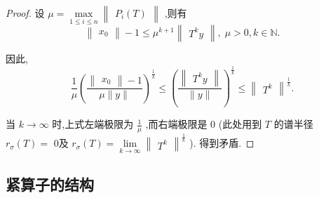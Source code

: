\documentclass[lang=cn,newtx,10pt,scheme=chinese,thmcnt=chapter]{elegantbook}
\begin{document}
\begin{proof}
设 \(\mu  = \mathop{\max }\limits_{{1 \leqslant  i \leqslant  n}}\begin{Vmatrix}{{P}_{i}\left( T\right) }\end{Vmatrix}\) ,则有
\begin{equation*}
\begin{Vmatrix}{x}_{0}\end{Vmatrix} - 1 \leqslant  {\mu }^{k + 1}\begin{Vmatrix}{{T}^{k}y}\end{Vmatrix},\;\mu  > 0,k \in  \mathbb{N}.
\end{equation*}

因此,
\begin{equation*}
\frac{1}{\mu }{\left( \frac{\begin{Vmatrix}{x}_{0}\end{Vmatrix} - 1}{\mu \parallel y\parallel }\right) }^{\frac{1}{k}} \leqslant  {\left( \frac{\begin{Vmatrix}{T}^{k}y\end{Vmatrix}}{\parallel y\parallel }\right) }^{\frac{1}{k}} \leqslant  {\begin{Vmatrix}{T}^{k}\end{Vmatrix}}^{\frac{1}{k}}.
\end{equation*}

当 \(k \rightarrow  \infty\) 时,上式左端极限为 \(\frac{1}{\mu }\) ,而右端极限是 0 (此处用到 \(T\) 的谱半径 \({r}_{\sigma }\left( T\right)  =\) 0及 \({r}_{\sigma }\left( T\right)  = \mathop{\lim }\limits_{{k \rightarrow  \infty }}{\begin{Vmatrix}{T}^{k}\end{Vmatrix}}^{\frac{1}{k}}\) ). 得到矛盾.

\end{proof}

\subsection{紧算子的结构}
\end{document}
